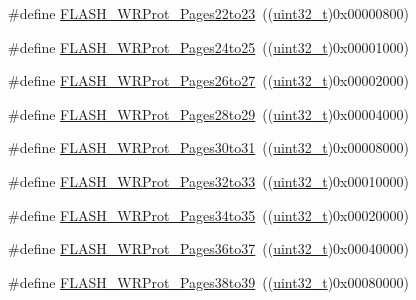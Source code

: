 \begin{DoxyCompactItemize}
\item 
\#define \hyperlink{group___option___bytes___write___protection_ga58394c78e6b08542381ade1674efe62c}{F\+L\+A\+S\+H\+\_\+\+W\+R\+Prot\+\_\+\+Pages22to23}~((\hyperlink{_p_e___types_8h_a33594304e786b158f3fb30289278f5af}{uint32\+\_\+t})0x00000800)
\item 
\#define \hyperlink{group___option___bytes___write___protection_gac36c4a402c77b28f46451e97dc3632f7}{F\+L\+A\+S\+H\+\_\+\+W\+R\+Prot\+\_\+\+Pages24to25}~((\hyperlink{_p_e___types_8h_a33594304e786b158f3fb30289278f5af}{uint32\+\_\+t})0x00001000)
\item 
\#define \hyperlink{group___option___bytes___write___protection_ga92c8a9f8b6875fccb072df795eff5e7e}{F\+L\+A\+S\+H\+\_\+\+W\+R\+Prot\+\_\+\+Pages26to27}~((\hyperlink{_p_e___types_8h_a33594304e786b158f3fb30289278f5af}{uint32\+\_\+t})0x00002000)
\item 
\#define \hyperlink{group___option___bytes___write___protection_gae42c20bedcbaf926c7c49f51a7eea63f}{F\+L\+A\+S\+H\+\_\+\+W\+R\+Prot\+\_\+\+Pages28to29}~((\hyperlink{_p_e___types_8h_a33594304e786b158f3fb30289278f5af}{uint32\+\_\+t})0x00004000)
\item 
\#define \hyperlink{group___option___bytes___write___protection_gaabe41461f613c6eb37c782295ad9f90f}{F\+L\+A\+S\+H\+\_\+\+W\+R\+Prot\+\_\+\+Pages30to31}~((\hyperlink{_p_e___types_8h_a33594304e786b158f3fb30289278f5af}{uint32\+\_\+t})0x00008000)
\item 
\#define \hyperlink{group___option___bytes___write___protection_ga86aa121a8917e58ad6bfdf98ba873d36}{F\+L\+A\+S\+H\+\_\+\+W\+R\+Prot\+\_\+\+Pages32to33}~((\hyperlink{_p_e___types_8h_a33594304e786b158f3fb30289278f5af}{uint32\+\_\+t})0x00010000)
\item 
\#define \hyperlink{group___option___bytes___write___protection_gaa5fee32ae0631b81413414f8e716868b}{F\+L\+A\+S\+H\+\_\+\+W\+R\+Prot\+\_\+\+Pages34to35}~((\hyperlink{_p_e___types_8h_a33594304e786b158f3fb30289278f5af}{uint32\+\_\+t})0x00020000)
\item 
\#define \hyperlink{group___option___bytes___write___protection_gab00dc29c0f12afd25cdb21b6d187ccc9}{F\+L\+A\+S\+H\+\_\+\+W\+R\+Prot\+\_\+\+Pages36to37}~((\hyperlink{_p_e___types_8h_a33594304e786b158f3fb30289278f5af}{uint32\+\_\+t})0x00040000)
\item 
\#define \hyperlink{group___option___bytes___write___protection_gacd33bf5c4a305a271da6035ed19cefc2}{F\+L\+A\+S\+H\+\_\+\+W\+R\+Prot\+\_\+\+Pages38to39}~((\hyperlink{_p_e___types_8h_a33594304e786b158f3fb30289278f5af}{uint32\+\_\+t})0x00080000)

\end{DoxyCompactItemize}
